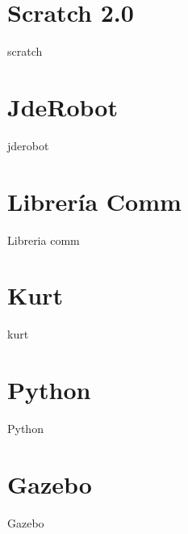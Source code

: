 \section{Scratch 2.0}
\label{sec:scratch}

scratch

\section{JdeRobot}
\label{sec:jderobot}

jderobot

\section{Librería Comm}
\label{sec:libreria-com}

Libreria comm

\section{Kurt}
\label{sec:kurt}

kurt

\section{Python}
\label{sec:python}

Python

\section{Gazebo}
\label{sec:gazebo}

Gazebo
